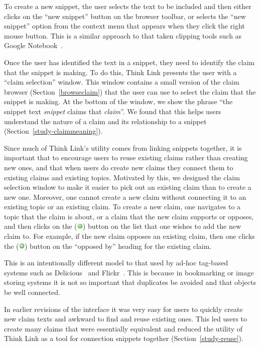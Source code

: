 \documentclass{chi2009}
\begin{document}
To create a new snippet, the user selects the text to be included and then either clicks on the ``new snippet'' button on the browser toolbar, or selects the ``new snippet'' option from the context menu that appears when they click the right mouse button. This is a similar approach to that taken clipping tools such as Google Notebook~\cite{googlenotebook}.

Once the user has identified the text in a snippet, they need to identify the claim that the snippet is making. To do this, Think Link presents the user with a ``claim selection'' window. This window contains a small version of the claim browser (Section~\ref{browseclaim}) that the user can use to select the claim that the snippet is making. At the bottom of the window, we show the phrase ``the snippet text {\it snippet} claims that {\it claim}''. We found that this helps users understand the nature of a claim and its relationship to a snippet (Section~\ref{study-claimmeaning}).

Since much of Think Link's utility comes from linking snippets together, it is important that to encourage users to reuse existing claims rather than creating new ones, and that when users do create new claims they connect them to existing claims and existing topics. Motivated by this, we designed the claim selection window to make it easier to pick out an existing claim than to create a new one. Moreover, one cannot create a new claim without connecting it to an existing topic or an existing claim. To create a new claim, one navigates to a topic that the claim is about, or a claim that the new claim supports or opposes, and then clicks on the (\includegraphics[width=0.3cm]{../images/add.png}) button on the list that one wishes to add the new claim to. For example, if the new claim opposes an existing claim, then one clicks the (\includegraphics[width=0.3cm]{../images/add.png}) button on the ``opposed by'' heading for the existing claim.

This is an intentionally different model to that used by ad-hoc tag-based~\cite{tags} systems such as Delicious~\cite{delicious} and Flickr~\cite{flickr}. This is because in bookmarking or image storing systems it is not so important that duplicates be avoided and that objects be well connected.

In earlier revisions of the interface it was very easy for users to quickly create new claim texts and awkward to find and reuse existing ones. This led users to create many claims that were essentially equivalent and reduced the utility of Think Link as a tool for connection snippets together (Section~\ref{study-reuse}). 
\end{document}
